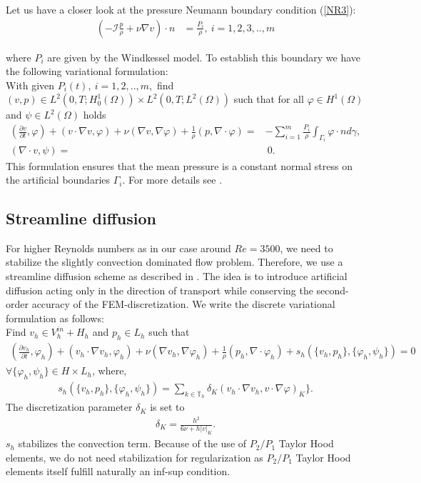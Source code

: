 \documentclass[a4paper, 11pt, twoside]{article}
\begin{document}
Let us have a closer look at the pressure Neumann boundary condition (\ref{NR3}):
\begin{align}
(- \mathcal{I} \frac{p}{\rho} + \nu \nabla v) \cdot n &= \frac{P_i}{\rho},\ i=1,2,3,..,m
\end{align}

where $P_i$ are given by the Windkessel model.
To establish this boundary we have the following variational formulation:\\
With given $P_i(t) ,\ i=1,2,..,m,$ find $(v,p) \in L^2(0,T;H_0^1(\Omega)) \times L^2(0,T;L^2(\Omega))$ such that for all $\varphi \in H^1(\Omega)$ and $\psi \in L^2(\Omega)$ holds
\begin{align}
 (\frac{\partial v}{\partial t},\varphi) + (v \cdot \nabla v,\varphi) + \nu (\nabla v,\nabla \varphi) + \frac{1}{\rho}(p,\nabla \cdot \varphi) =& - \sum_{i=1}^m \frac{P_i}{\rho} \int_{\Gamma_i} \varphi \cdot n d\gamma,\\\label{weak}
 (\nabla \cdot v,\psi) =&\ 0.
\end{align}
This formulation ensures that the mean pressure is a constant normal stress on the artificial boundaries $\Gamma_i$.
For more details see \cite{cardio}.

\subsection{Streamline diffusion}
For higher Reynolds numbers as in our case around $Re=3500$, we need to stabilize the slightly convection dominated flow problem.
Therefore, we use a streamline diffusion scheme as described in \cite{rannacher}. The idea is to introduce artificial diffusion acting only in the direction of 
transport while conserving the second-order accuracy of the FEM-discretization.
We write the discrete variational formulation as follows:\\
Find $v_h \in V_h^{in} + H_h$ and $p_h \in L_h$ such that
\begin{align*}
 (\frac{\partial v_h}{\partial t},\varphi_h) + (v_h \cdot \nabla v_h,\varphi_h) + \nu (\nabla v_h,\nabla \varphi_h) + \frac{1}{\rho}(p_h,\nabla \cdot \varphi_h) + s_h(\{v_h,p_h\},\{\varphi_h,\psi_h\}) = 0
\end{align*}
$\forall \{\varphi_h, \psi_h\} \in H \times L_h$, where,
\begin{align*}
s_h(\{v_h,p_h\},\{\varphi_h,\psi_h\}) = \sum_{k \in \mathbb{T}_h} \delta_K (v_h \cdot \nabla v_h, v \cdot \nabla \varphi)_K\}.
\end{align*}
The discretization parameter $\delta_K$ is set to
\begin{align*}
\delta_K = \frac{h^2}{6\nu + h |v|_K}.
\end{align*}
$s_h$ stabilizes the convection term. Because of the use of $P_2/P_1$ Taylor Hood elements, we do not need stabilization for regularization as
$P_2/P_1$ Taylor Hood elements itself fulfill naturally an inf-sup condition.
\end{document}
